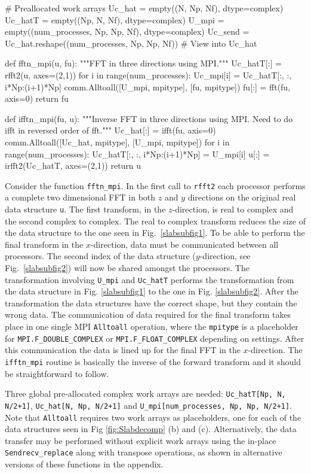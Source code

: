 \documentclass[11pt, oneside]{article}
\newcommand{\inpyth}{\lstinline[style=pythonstyle, basicstyle=\ttfamily]} %[]%
\begin{document}
\begin{python}
# Preallocated work arrays
Uc_hat  = empty((N, Np, Nf), dtype=complex) 
Uc_hatT = empty((Np, N, Nf), dtype=complex) 
U_mpi   = empty((num_processes, Np, Np, Nf), dtype=complex)
Uc_send = Uc_hat.reshape((num_processes, Np, Np, Nf)) # View into Uc_hat

def fftn_mpi(u, fu):
    """FFT in three directions using MPI."""
    Uc_hatT[:] = rfft2(u, axes=(2,1))
    for i in range(num_processes):
        Uc_mpi[i] = Uc_hatT[:, :, i*Np:(i+1)*Np]
    comm.Alltoall([U_mpi, mpitype], [fu, mpitype])
    fu[:] = fft(fu, axis=0)
    return fu

def ifftn_mpi(fu, u):
    """Inverse FFT in three directions using MPI.
       Need to do ifft in reversed order of fft."""
    Uc_hat[:] = ifft(fu, axis=0)
    comm.Alltoall([Uc_hat, mpitype], [U_mpi, mpitype])
    for i in range(num_processes):
        Uc_hatT[:, :, i*Np:(i+1)*Np] = U_mpi[i]
    u[:] = irfft2(Uc_hatT, axes=(2,1))
    return u
\end{python}
Consider the function \inpyth{fftn_mpi}. In the first call to \inpyth{rfft2} each processor performs a complete two dimensional FFT in both $z$ and $y$ directions on the original real data structure \inpyth{u}. The first transform, in the $z$-direction, is real to complex and the second complex to complex. The real to complex transform reduces the size of the data structure to the one seen in Fig.~\ref{slabsubfig1}. To be able to perform the final transform in the $x$-direction, data must be communicated between all processors. The second index of the data structure ($y$-direction, see Fig.~\ref{slabsubfig2}) will now be shared amongst the processors. The transformation involving \inpyth{U_mpi} and \inpyth{Uc_hatT} performs the transformation from the data structure in Fig. \ref{slabsubfig1} to the one in Fig. \ref{slabsubfig2}. After the transformation the data structures have the correct shape, but they contain the wrong data. The communication of data required for the final transform takes place in one single MPI \inpyth{Alltoall} operation, where the \inpyth{mpitype} is a placeholder for \inpyth{MPI.F_DOUBLE_COMPLEX} or \inpyth{MPI.F_FLOAT_COMPLEX} depending on settings. After this communication the data is lined up for the final FFT in the $x$-direction. The \inpyth{ifftn_mpi} routine is basically the inverse of the forward transform and it should be straightforward to follow.

Three global pre-allocated complex work arrays are needed: \inpyth{Uc_hatT[Np, N, N/2+1]},  \inpyth{Uc_hat[N, Np, N/2+1]} and \inpyth{U_mpi[num_processes, Np, Np, N/2+1]}.
Note that  \inpyth{Alltoall} requires two work arrays as placeholders, one for each of the data structures seen in Fig \ref{fig:Slabdecomp} (b) and (c). Alternatively, the data transfer may be performed without explicit work arrays using the in-place \inpyth{Sendrecv_replace} along with transpose operations, as shown in alternative versions of these functions in the appendix.
\end{document}

